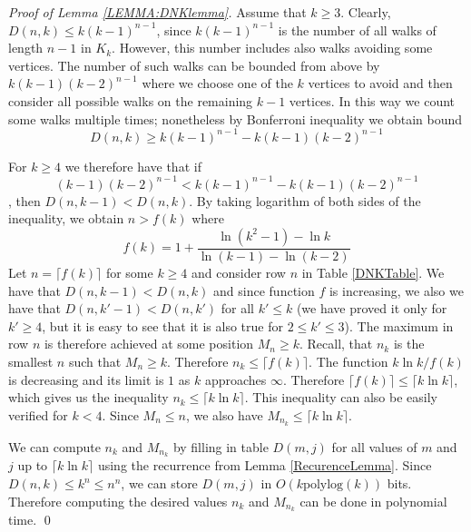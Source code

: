\begin{proof}[Proof of Lemma \ref{LEMMA:DNKlemma}] 
Assume that $k\ge 3$. Clearly, $D(n,k)\leq k(k-1)^{n-1}$, since
$k(k-1)^{n-1}$ is the number of all walks of length $n-1$ in
$K_k$. However, this number includes also walks avoiding some
vertices. The number of such walks can be bounded from above by
$k(k-1)(k-2)^{n-1}$ where we choose one of the $k$ vertices to avoid
and then consider all possible walks on the remaining $k-1$
vertices. In this way we count some walks multiple times; nonetheless
by Bonferroni inequality we obtain bound $$D(n,k)\geq
k(k-1)^{n-1}-k(k-1)(k-2)^{n-1}$$

For $k\ge 4$ we therefore have that if
$$(k-1)(k-2)^{n-1}<k(k-1)^{n-1}-k(k-1)(k-2)^{n-1}$$, then
$D(n,k-1)<D(n,k)$.  By taking logarithm of both sides of the inequality, we
obtain $n>f(k)$ where $$f(k) = 1+\frac{\ln(k^2-1)-\ln
  k}{\ln(k-1)-\ln(k-2)}$$  Let $n = \lceil f(k)\rceil$ for some $k\ge
4$ and consider row $n$ in Table \ref{DNKTable}.
We have that $D(n,k-1)<D(n,k)$ and since function $f$ is
increasing, we also we have that $D(n,k'-1)<D(n,k')$ for all $k'\le k$ 
(we have proved it only for $k'\ge 4$, but it is easy to see that it is
also true for $2\le k'\le 3$). The maximum in row $n$ is therefore
achieved at some position $M_n \ge k$. Recall, that $n_k$ is the
smallest $n$ such that $M_n\ge k$. Therefore $n_k\leq \lceil f(k)\rceil$.
The function $k \ln k/f(k)$ is decreasing and its limit is $1$ as $k$
approaches $\infty$. Therefore $\lceil f(k)\rceil\leq\lceil k\ln k\rceil$,
which gives us the inequality $n_k\le \lceil k \ln k\rceil$. This inequality 
can also be easily verified for $k<4$. Since $M_n\le n$,
we also have $M_{n_k}\le \lceil k \ln k\rceil$. 

We can compute $n_k$ and $M_{n_k}$ by filling in table $D(m,j)$ for
all values of $m$ and $j$ up to $\lceil k\ln k\rceil$ using the
recurrence from Lemma \ref{RecurenceLemma}. Since $D(n,k)\leq k^n\leq
n^n$, we can store $D(m,j)$ in $O(k \mbox{polylog}(k))$ bits.
Therefore computing the desired values $n_k$ and $M_{n_k}$ 
can be done in polynomial time. \qed
\end{proof}



